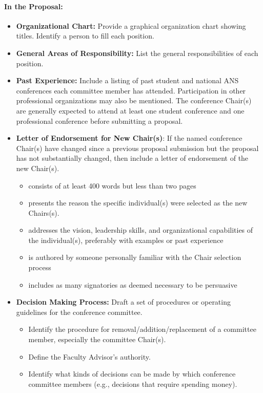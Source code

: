\documentclass[12pt]{article}
\begin{document}
\paragraph{In the Proposal:}
\begin{itemize}
\item{\textbf{Organizational Chart:} Provide a graphical organization chart showing titles.
Identify a person to fill each position.}
\item{\textbf{General Areas of Responsibility:} List the general responsibilities of each
position.}
\item{\textbf{Past Experience:} Include a listing of past student and national ANS conferences
each committee member has attended. Participation in other professional
organizations may also be mentioned. The conference Chair(s) are generally expected to attend at least one student conference and one professional conference before submitting a proposal.}
\item{\textbf{Letter of Endorsement for New Chair(s)}: If the named conference Chair(s)
have changed since a previous proposal submission but the proposal has not
substantially changed, then include a letter of endorsement of the new Chair(s).
\begin{itemize}
\item{consists of at least 400 words but less than two pages}
\item{presents the reason the specific individual(s) were selected as the new Chairs(s).}
\item{addresses the vision, leadership skills, and organizational capabilities of the
individual(s), preferably with examples or past experience}
\item{is authored by someone personally familiar with the Chair selection process}
\item{includes as many signatories as deemed necessary to be persuasive}
\end{itemize}
}
\item{\textbf{Decision Making Process:} Draft a set of procedures or operating guidelines for the conference committee.
\begin{itemize}
\item{Identify the procedure for removal/addition/replacement of a committee member, especially the committee Chair(s).}
\item{Define the Faculty Advisor’s authority.}
\item{Identify what kinds of decisions can be made by which conference committee members (e.g., decisions that require spending money).}
\end{itemize}
}
\end{itemize}
\end{document}
